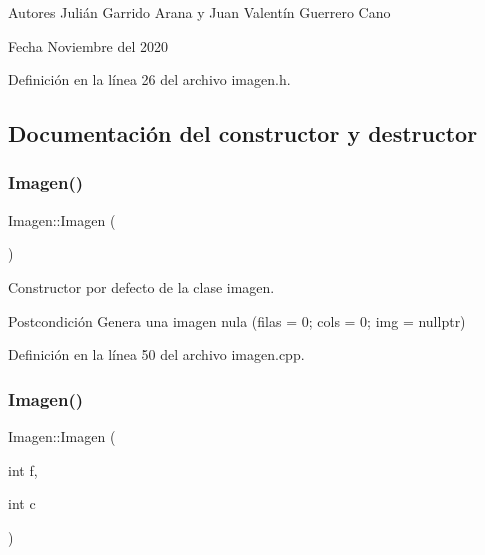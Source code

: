 \begin{DoxyAuthor}{Autores}
Julián Garrido Arana y Juan Valentín Guerrero Cano 
\end{DoxyAuthor}
\begin{DoxyDate}{Fecha}
Noviembre del 2020 
\end{DoxyDate}


Definición en la línea 26 del archivo imagen.\+h.



\subsection{Documentación del constructor y destructor}
\mbox{\label{classImagen_ab2e649aa7a105155c7bfdb846abf0528}} 
\subsubsection{\texorpdfstring{Imagen()}{Imagen()}\hspace{0.1cm}{\footnotesize\ttfamily [1/4]}}
{\footnotesize\ttfamily Imagen\+::\+Imagen (\begin{DoxyParamCaption}{ }\end{DoxyParamCaption})}



Constructor por defecto de la clase imagen. 

\begin{DoxyPostcond}{Postcondición}
Genera una imagen nula (filas = 0; cols = 0; img = nullptr) 
\end{DoxyPostcond}


Definición en la línea 50 del archivo imagen.\+cpp.

\mbox{\label{classImagen_a4b397c4a3dc0794cab351f96dc9390fd}} 
\subsubsection{\texorpdfstring{Imagen()}{Imagen()}\hspace{0.1cm}{\footnotesize\ttfamily [2/4]}}
{\footnotesize\ttfamily Imagen\+::\+Imagen (\begin{DoxyParamCaption}\item[{int}]{f,  }\item[{int}]{c }\end{DoxyParamCaption})}



